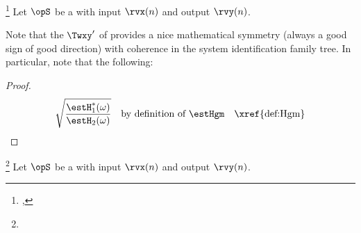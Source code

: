 \begin{definition}
\footnote{
  ,
  }
Let $\opS$ be a  with input $\rvx(n)$ and output $\rvy(n)$.
\end{definition}

\begin{remark}
\label{rem:HgmTxyCxy}
Note that the  $\Twxy'$ of 
provides a nice mathematical symmetry (always a good sign of good direction) with coherence 
in the system identification family tree.
In particular, note that the following:
\end{remark}
\begin{proof}
\begin{align*}
  \sqrt{\frac{\estH_1^\ast(\omega)}{\estH_2(\omega)}}
    && \text{by definition of $\estHgm$}
    && \text{\xref{def:Hgm}}
\end{align*}
\end{proof}



\begin{definition}
\footnote{
  }
\label{def:Hharm}
Let $\opS$ be a  with input $\rvx(n)$ and output $\rvy(n)$.
\end{definition}


